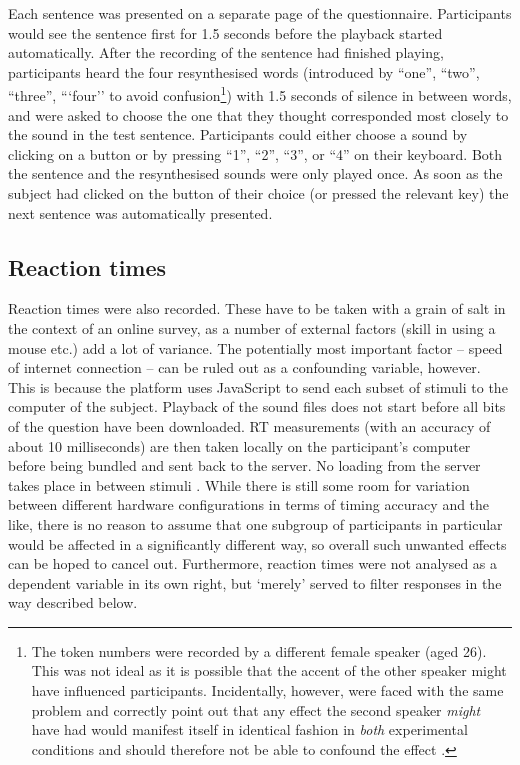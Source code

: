 Each sentence was presented on a separate page of the questionnaire.
Participants would see the sentence first for 1.5 seconds before the playback started automatically.
After the recording of the sentence had finished playing, participants heard the four resynthesised words (introduced by ``one'', ``two'', ``three'', ```four'' to avoid confusion\footnote{The token numbers were recorded by a different female speaker (aged 26). This was not ideal as it is possible that the accent of the other speaker might have influenced participants. Incidentally, however, \citeauthor{haydrager2010} were faced with the same problem and correctly point out that any effect the second speaker \emph{might} have had would manifest itself in identical fashion in \emph{both} experimental conditions and should therefore not be able to confound the  effect \parencite[cf.][871 and 889]{haydrager2010}.}) with 1.5 seconds of silence in between words, and were asked to choose the one that they thought corresponded most closely to the sound in the test sentence.
Participants could either choose a sound by clicking on a button or by pressing ``1'', ``2'', ``3'', or ``4'' on their keyboard.
Both the sentence and the resynthesised sounds were only played once.
As soon as the subject had clicked on the button of their choice (or pressed the relevant key) the next sentence was automatically presented.

\subsection{Reaction times}
\label{sec.perc_method.pres.rt}

Reaction times were also recorded.
These have to be taken with a grain of salt in the context of an online survey, as a number of external factors (skill in using a mouse etc.) add a lot of variance.
The potentially most important factor -- speed of internet connection -- can be ruled out as a confounding variable, however.
This is because the platform uses JavaScript to send each subset of stimuli to the computer of the subject.
Playback of the sound files does not start before all bits of the question have been downloaded.
RT measurements (with an accuracy of about 10 milliseconds) are then taken locally on the participant's computer before being bundled and sent back to the server.
No loading from the server takes place in between stimuli \parencite[cf.][]{sosci}.
While there is still some room for variation between different hardware configurations in terms of timing accuracy and the like, there is no reason to assume that one subgroup of participants in particular would be affected in a significantly different way, so overall such unwanted effects can be hoped to cancel out.
Furthermore, reaction times were not analysed as a dependent variable in its own right, but `merely' served to filter responses in the way described below.

